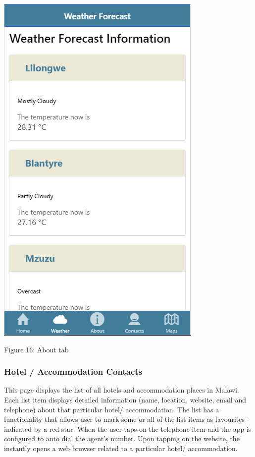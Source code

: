 \begin{center}    
	\includegraphics{img/weather.png}
\end{center}
\begin{center}
	Figure 16: About tab 
\end{center}
\paragraph{}

\subsubsection{Hotel / Accommodation Contacts}
This page displays the list of all hotels and accommodation places in Malawi. Each list item displays detailed information (name, location, website, email and telephone) about that particular hotel/ accommodation. The list has a functionality that allows user to mark some or all of the list items as favourites - indicated by a red star. When the user taps on the telephone item and the app is configured to auto dial the agent’s number. Upon tapping on the website, the instantly opens a web browser related to a particular hotel/ accommodation. 

